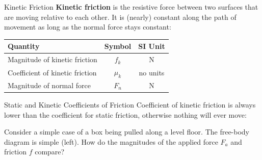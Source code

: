 \documentclass[12pt,compress,aspectratio=169]{beamer}
\begin{document}
\begin{frame}{Kinetic Friction}
  \textbf{Kinetic friction} is the resistive force between two surfaces that
  are moving relative to each other. It is (nearly) constant along the path of
  movement as long as the normal force stays constant:

  \begin{center}
    \begin{tabular}{l|c|c}
      \rowcolor{pink}
      \textbf{Quantity} & \textbf{Symbol} & \textbf{SI Unit} \\ \hline
      Magnitude of kinetic friction & $f_k$ & \si\newton \\
      Coefficient of kinetic friction & $\mu_k$ & no units \\
      Magnitude of normal force & $F_n$ & \si\newton
    \end{tabular}
  \end{center}
\end{frame}



\begin{frame}{Static and Kinetic Coefficients of Friction}    
  Coefficient of kinetic friction is always lower than the coefficient for
  static friction, otherwise nothing will ever move:
    

  \vspace{-.2in}Consider a simple case of a box being pulled along a level
  floor. The free-body diagram is simple (left). How do the magnitudes of the
  applied force $F_a$ and friction $f$ compare?

  \begin{columns}
    \centering

    \centering
  \end{columns}
\end{frame}
\end{document}
